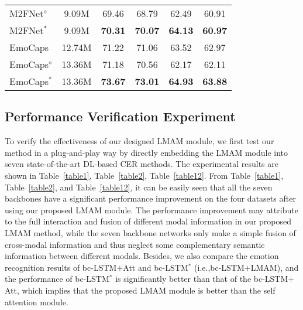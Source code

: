 {{\begin{table}[htbp]
{\begin{tabular}{l|ccccc}
			M2FNet$^\diamond$                 & 9.09M                                      & 69.46                     & 68.79                     & 62.49                     & 60.91                     \\
			M2FNet$^\ast$                 & 9.09M                                      & \textbf{70.31}                     & \textbf{70.07}                     & \textbf{64.13}                     & \textbf{60.97}                     \\ \hline
			EmoCaps  \cite{li2022emocaps}               & \multicolumn{1}{c}{12.74M}                 & \multicolumn{1}{c}{71.22} & \multicolumn{1}{c}{71.06} & \multicolumn{1}{c}{63.52} & \multicolumn{1}{c}{62.97} \\
			EmoCaps$^\diamond$                 & 13.36M                                     & 71.18                     & 70.56                     & 62.17                     & 62.11                     \\
			EmoCaps$^\ast$                 & 13.36M                                     & \textbf{73.67}                     & \textbf{73.01}                     & \textbf{64.93}                     & \textbf{63.88}                     \\ \hline
	\end{tabular}}
\end{table}

\subsection{Performance Verification Experiment}
To verify the {effectiveness} of our designed LMAM module, we first test our method in a plug-and-play way by directly embedding the LMAM module into seven state-of-the-art DL-based CER methods. The experimental results are shown in Table~\ref{table1}, Table~\ref{table2}, {Table~\ref{table12}}. From Table~\ref{table1}, Table~\ref{table2}, and {Table~\ref{table12}}, it can be easily seen that all the seven backbones have a significant performance improvement {on the four datasets} after using our proposed LMAM module. The performance improvement may attribute to the full interaction and fusion of different modal information in our proposed LMAM method, while the seven backbone networks only make a simple fusion of cross-modal information and thus neglect some complementary semantic information {between} different modals. Besides, we also compare the emotion recognition results of bc-LSTM$+$Att and bc-LSTM$^\ast$ (i.e.,bc-LSTM$+$LMAM), and the performance of bc-LSTM$^\ast$ is significantly better than that of the bc-LSTM$+$Att, which implies that the proposed LMAM module is better than the self attention module.

}}
